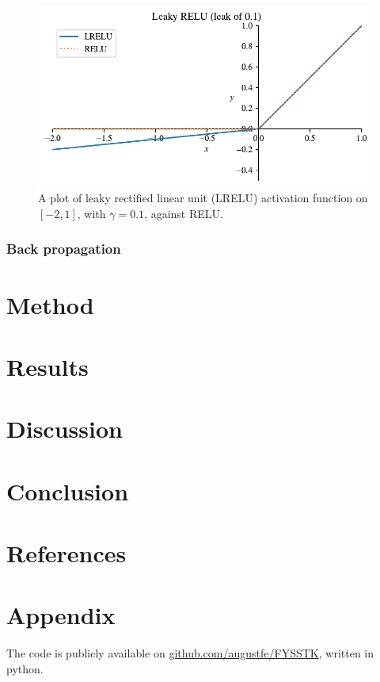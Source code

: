 \documentclass{article}
\theoremstyle{definition}
\begin{document}
\begin{figure}[ht]
    \centering
    \includegraphics[width=.7\textwidth]{activators/LRELU.pdf}
    \caption{A plot of leaky rectified linear unit (LRELU) activation function on $[-2, 1]$, with $\gamma=0.1$, against RELU.}
    \label{fig:LRELU}
\end{figure}


\subsubsection{Back propagation}

\section{Method}

\section{Results}

\section{Discussion}

\section{Conclusion}

\section{References}


\section{Appendix}
The code is publicly available on \href{https://github.com/augustfe/FYSSTK}{github.com/augustfe/FYSSTK}, written in python.
\end{document}
